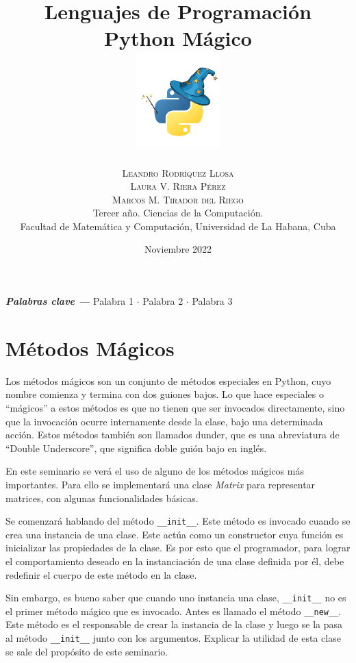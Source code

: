\documentclass[10pt]{article} %
\title{\normalsize{Lenguajes de Programaci\'on}\\
\Huge\bfseries Python M\'agico\\
\includegraphics[height=5em]{magic_logo.png}} %
\author{%
\normalsize\textsc{Leandro Rodr\'iquez Llosa}\\
\normalsize\textsc{Laura V. Riera P\'erez}\\ 
\normalsize\textsc{Marcos M. Tirador del Riego} \\[2ex]
\small Tercer a\~no. Ciencias de la Computaci\'on. \\ %
\small Facultad de Matem\'atica y Computaci\'on, Universidad de La Habana, Cuba \\ %
}
\date{\footnotesize Noviembre 2022 } %
\providecommand{\keywords}[1]
{
	\small	
	\vspace{0.5em}
	\noindent \textbf{\textit{Palabras clave --- }} #1
}
\renewenvironment{abstract}
{\small
	\begin{center}
		\bfseries \abstractname\vspace{-.5em}\vspace{0pt}
	\end{center}
	\list{}{
		\setlength{\leftmargin}{1.5cm}%
		\setlength{\rightmargin}{\leftmargin}%
	}%
	\item\relax}
{\endlist}
\newcommand{\mgc}[2][]{\colorbox{backcolour}{\texttt{\_\_#2\_\_#1}}}
\begin{document}
\maketitle

\begin{abstract}
	\noindent \blindtext %
	
	\keywords{Palabra 1 \textbf{$\cdot$} Palabra 2 \textbf{$\cdot$} Palabra 3}
\end{abstract}



\vspace{1em}
\section{M\'etodos M\'agicos}

Los m\'etodos m\'agicos son un conjunto de m\'etodos especiales en Python, cuyo nombre comienza y termina con dos guiones bajos. Lo que hace especiales o ``m\'agicos'' a estos m\'etodos es que no tienen que ser invocados directamente, sino que la invocaci\'on ocurre internamente desde la clase, bajo una determinada acci\'on. Estos m\'etodos tambi\'en son llamados dunder, que es una abreviatura de ``Double Underscore'', que significa doble gui\'on bajo en ingl\'es. 

En este seminario se ver\'a el uso de alguno de los m\'etodos m\'agicos m\'as importantes. Para ello se implementar\'a una clase \emph{Matrix} para representar matrices, con algunas funcionalidades b\'asicas.

Se comenzar\'a hablando del m\'etodo \mgc{init}. Este m\'etodo es invocado cuando se crea una instancia de una clase. Este act\'ua como un constructor cuya funci\'on es inicializar las propiedades de la clase. Es por esto que el programador, para lograr el comportamiento deseado en la instanciaci\'on de una clase definida por \'el, debe redefinir el cuerpo de este m\'etodo en la clase.

Sin embargo, es bueno saber que cuando uno instancia una clase, \mgc{init} no es el primer m\'etodo m\'agico que es invocado. Antes es llamado el m\'etodo  \mgc{new}. Este m\'etodo es el responsable de crear la instancia de la clase y luego se la pasa al m\'etodo \mgc{init} junto con los argumentos. Explicar la utilidad de esta clase se sale del prop\'osito de este seminario.
\end{document}

